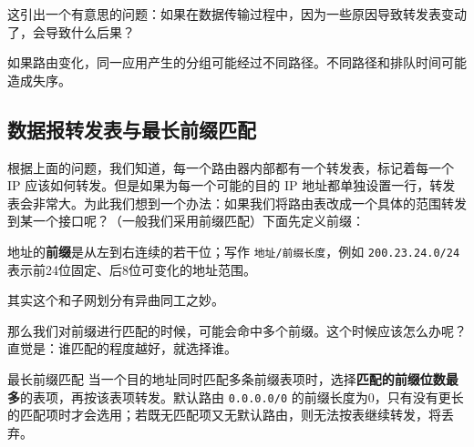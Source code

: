 这引出一个有意思的问题：如果在数据传输过程中，因为一些原因导致转发表变动了，会导致什么后果？

\begin{proposition}
如果路由变化，同一应用产生的分组可能经过不同路径。不同路径和排队时间可能造成失序。
\end{proposition}

\subsection{数据报转发表与最长前缀匹配}
根据上面的问题，我们知道，每一个路由器内部都有一个转发表，标记着每一个 IP 应该如何转发。但是如果为每一个可能的目的 IP 地址都单独设置一行，转发表会非常大。为此我们想到一个办法：如果我们将路由表改成一个具体的范围转发到某一个接口呢？（一般我们采用前缀匹配）下面先定义前缀：

\begin{definition}
地址的\textbf{前缀}是从左到右连续的若干位；写作 \texttt{地址/前缀长度}，例如 \texttt{200.23.24.0/24} 表示前24位固定、后8位可变化的地址范围。
\end{definition}
\begin{remark}
其实这个和子网划分有异曲同工之妙。
\end{remark}

那么我们对前缀进行匹配的时候，可能会命中多个前缀。这个时候应该怎么办呢？直觉是：谁匹配的程度越好，就选择谁。

\begin{proposition}{最长前缀匹配}
当一个目的地址同时匹配多条前缀表项时，选择\textbf{匹配的前缀位数最多}的表项，再按该表项转发。默认路由 \texttt{0.0.0.0/0} 的前缀长度为0，只有没有更长的匹配项时才会选用；若既无匹配项又无默认路由，则无法按表继续转发，将丢弃。
\end{proposition}

